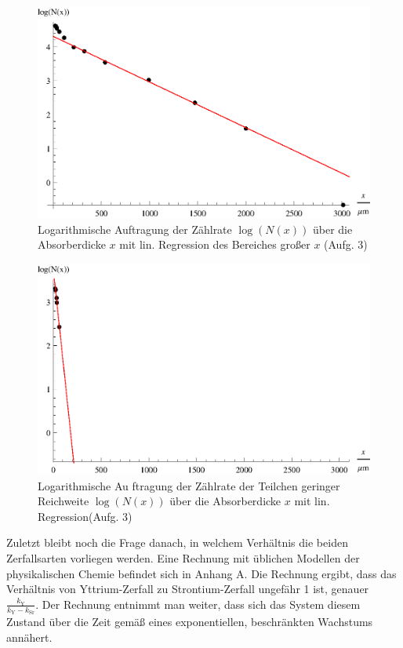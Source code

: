 \begin{figure}[p]
\centering
\includegraphics[scale=1.0]{fig/iii_3_plotb.eps}
\caption{Logarithmische Auftragung der Zählrate $\log(N(x))$ über die Absorberdicke $x$ mit lin. Regression des Bereiches großer $x$ (Aufg. 3)}
\label{fig:iii_3_plotb}
\end{figure}

\begin{figure}[p]
\centering
\includegraphics[scale=1.0]{fig/iii_3_plotc.eps}
\caption{Logarithmische Au
ftragung der Zählrate der Teilchen geringer Reichweite $\log(N(x))$ über die Absorberdicke $x$ mit lin. Regression(Aufg. 3)}
\label{fig:iii_3_plotc}
\end{figure}

Zuletzt bleibt noch die Frage danach, in welchem Verhältnis die beiden Zerfallsarten vorliegen werden. Eine Rechnung mit üblichen Modellen der physikalischen Chemie befindet sich in Anhang A.
Die Rechnung ergibt, dass das Verhältnis von Yttrium-Zerfall zu Strontium-Zerfall ungefähr 1 ist, genauer $\frac{k_\mathrm{Y}}{k_\mathrm{Y} - k_\mathrm{Sr}}$. Der Rechnung entnimmt man weiter, dass sich das System diesem Zustand über die Zeit gemäß eines exponentiellen, beschränkten Wachstums annähert.


